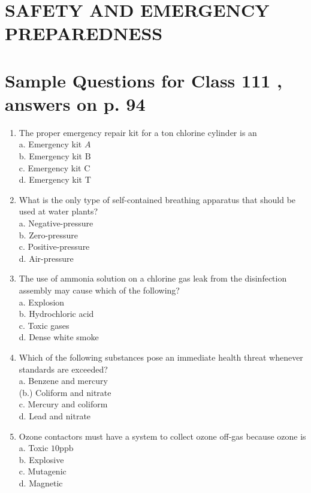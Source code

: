 \documentclass[10pt]{article}
\begin{document}
\section{SAFETY AND EMERGENCY PREPAREDNESS}
\section{Sample Questions for Class 111 , answers on p. 94}
\begin{enumerate}
  \item The proper emergency repair kit for a ton chlorine cylinder is an\\
a. Emergency kit $A$\\
b. Emergency kit $\mathrm{B}$\\
c. Emergency kit C\\
d. Emergency kit T

  \item What is the only type of self-contained breathing apparatus that should be used at water plants?\\
a. Negative-pressure\\
b. Zero-pressure\\
c. Positive-pressure\\
d. Air-pressure

  \item The use of ammonia solution on a chlorine gas leak from the disinfection assembly may cause which of the following?\\
a. Explosion\\
b. Hydrochloric acid\\
c. Toxic gases\\
d. Dense white smoke

  \item Which of the following substances pose an immediate health threat whenever standards are exceeded?\\
a. Benzene and mercury\\
(b.) Coliform and nitrate\\
c. Mercury and coliform\\
d. Lead and nitrate

  \item Ozone contactors must have a system to collect ozone off-gas because ozone is\\
a. Toxic $10 \mathrm{ppb}$\\
b. Explosive\\
c. Mutagenic\\
d. Magnetic

\end{enumerate}
\end{document}
